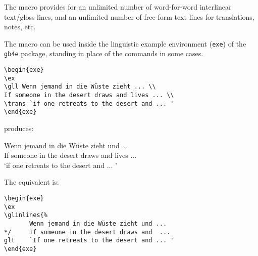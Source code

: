 \documentclass{article}
\begin{document}
%
%
%
	\mfssetpreformat{}




The  macro provides for an unlimited number of word-for-word interlinear text/gloss lines, and an unlimited number of free-form text lines for translations, notes, etc.

The macro can be used inside the linguistic example environment (\verb|exe|) of the \verb|gb4e| package, standing in place of the  commands in some cases.

\begin{verbatim}
\begin{exe}
\ex
\gll Wenn jemand in die Wüste zieht ... \\
If someone in the desert draws and lives ... \\
\trans `if one retreats to the desert and ... '
\end{exe}
\end{verbatim}

produces:

\begin{exe}
\ex
\gll Wenn jemand in die Wüste zieht und ... \\
If someone in the desert draws and lives ... \\
\trans `if one retreats to the desert and ... '
\end{exe}


The  equivalent is:

\begin{verbatim}
\begin{exe}
\ex
\glinlines{%
       Wenn jemand in die Wüste zieht und ... 
*/     If someone in the desert draws and  ... 
glt    `If one retreats to the desert and ... '
\end{exe}
\end{verbatim}
\end{document}
